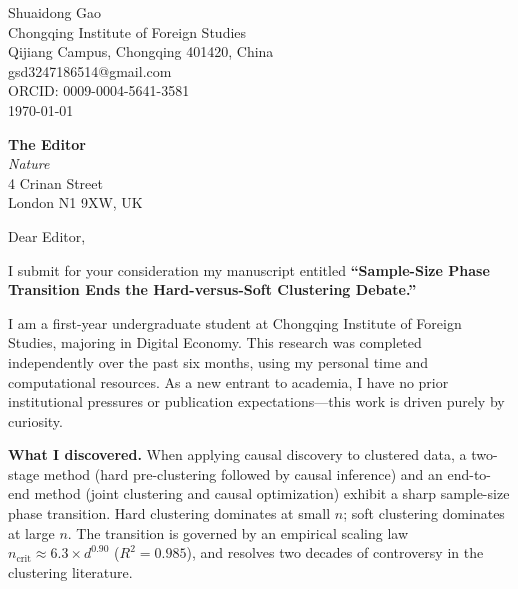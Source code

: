 \documentclass[12pt,a4paper]{article}
\begin{document}
\begin{flushright}
Shuaidong Gao\\
Chongqing Institute of Foreign Studies\\
Qijiang Campus, Chongqing 401420, China\\
gsd3247186514@gmail.com\\
ORCID: 0009-0004-5641-3581\\
\today
\end{flushright}

\vspace{1cm}

\noindent\textbf{The Editor}\\
\textit{Nature}\\
4 Crinan Street\\
London N1 9XW, UK

\vspace{1cm}

\noindent Dear Editor,

\vspace{0.3cm}

I submit for your consideration my manuscript entitled \textbf{``Sample-Size Phase Transition Ends the Hard-versus-Soft Clustering Debate.''}

I am a first-year undergraduate student at Chongqing Institute of Foreign Studies, majoring in Digital Economy. This research was completed independently over the past six months, using my personal time and computational resources. As a new entrant to academia, I have no prior institutional pressures or publication expectations---this work is driven purely by curiosity.

\bigskip

\noindent\textbf{What I discovered.} When applying causal discovery to clustered data, a two-stage method (hard pre-clustering followed by causal inference) and an end-to-end method (joint clustering and causal optimization) exhibit a sharp sample-size phase transition. Hard clustering dominates at small $n$; soft clustering dominates at large $n$. The transition is governed by an empirical scaling law $n_{\text{crit}} \approx 6.3 \times d^{0.90}$ ($R^2 = 0.985$), and resolves two decades of controversy in the clustering literature.
\end{document}
